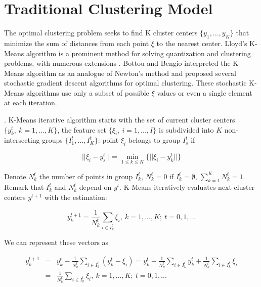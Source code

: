 \section{Traditional Clustering Model}

The optimal clustering problem seeks to find K cluster centers $ \{ y_1, ..., y_K \} $ that minimize the sum of distances from each point $ \xi $ to the nearest center. Lloyd's K-Means algorithm \cite{Lloyd_1982} is a prominent method for solving quantization and clustering problems, with numerous extensions \cite{Jain_2010}. Bottou and Bengio \cite{Bottou_1994} interpreted the K-Means algorithm as an analogue of Newton's method and proposed several stochastic gradient descent algorithms for optimal clustering. These stochastic K-Means algorithms use only a subset of possible $ \xi $ values or even a single element at each iteration.

\begin{definition}
    \label{KMeans} \cite{Lloyd_1982}. K-Means iterative algorithm starts with the set of current cluster centers $ \{ y_k^t, \> k = 1, ..., K \} $, the feature set $ \{ \xi_i, \> i = 1, ..., I \} $ is subdivided into $ K $ non-intersecting groups $ \{ I_1^t, ..., I_K^t \} $: point $ \xi_i $ belongs to group $ I_s^t $ if

    \begin{equation}
        \label{kmeans-group:eq}
            || \xi_i - y_s^t || = \min_{1 \leq k \leq K} \{ || \xi_i - y_k^t || \}
    \end{equation}

    \noindent Denote $ N_k^t $ the number of points in group $ I_k^t $, $ N_k^t = 0 $ if $ I_k^t = \emptyset $, $ \sum_{k=1}^K N_k^t = 1 $. Remark that $ I_k^t $ and $ N_k^t $ depend on $ y^t $. K-Means iteratively evaluates next cluster centers $ y^{t+1} $ with the estimation:

    \begin{equation}
        \label{kmeans-center-estimation:eq}
            y_{k}^{t + 1} = \frac{1}{N_k^t} \sum_{i \in I_k^t} \xi_i, \> k = 1, ..., K; \> t = 0, 1, ...
    \end{equation}

    \noindent We can represent these vectors as

    \begin{eqnarray}
        \label{kmeans-center-alt:eq}
            y_{k}^{t + 1} &=& y_k^t - \frac{1}{N_k^t} \sum_{i \in I_k^t} (y_k^t - \xi_i) = y_k^t - \frac{1}{N_k^t} \sum_{i \in I_k^t} y_k^t + \frac{1}{N_k^t} \sum_{i \in I_k^t} \xi_i \nonumber \\
            &=& \frac{1}{N_k^t} \sum_{i \in I_k^t} \xi_i, \> k = 1, ..., K; \> t = 0, 1, ...
    \end{eqnarray}
\end{definition}

